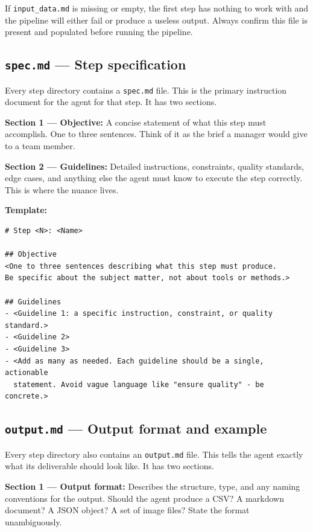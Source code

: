\documentclass[12pt, a4paper]{article}
\begin{document}
\begin{warnbox}
If \texttt{input\_data.md} is missing or empty, the first step has nothing to work with and the pipeline will either fail or produce a useless output. Always confirm this file is present and populated before running the pipeline.
\end{warnbox}

\subsection{\texttt{spec.md} — Step specification}

Every step directory contains a \texttt{spec.md} file. This is the primary instruction document for the agent for that step. It has two sections.

\textbf{Section 1 — Objective:} A concise statement of what this step must accomplish. One to three sentences. Think of it as the brief a manager would give to a team member.

\textbf{Section 2 — Guidelines:} Detailed instructions, constraints, quality standards, edge cases, and anything else the agent must know to execute the step correctly. This is where the nuance lives.

\textbf{Template:}

\begin{lstlisting}[language={}]
# Step <N>: <Name>

## Objective
<One to three sentences describing what this step must produce.
Be specific about the subject matter, not about tools or methods.>

## Guidelines
- <Guideline 1: a specific instruction, constraint, or quality standard.>
- <Guideline 2>
- <Guideline 3>
- <Add as many as needed. Each guideline should be a single, actionable
  statement. Avoid vague language like "ensure quality" - be concrete.>
\end{lstlisting}

\subsection{\texttt{output.md} — Output format and example}

Every step directory also contains an \texttt{output.md} file. This tells the agent exactly what its deliverable should look like. It has two sections.

\textbf{Section 1 — Output format:} Describes the structure, type, and any naming conventions for the output. Should the agent produce a CSV? A markdown document? A JSON object? A set of image files? State the format unambiguously.
\end{document}
